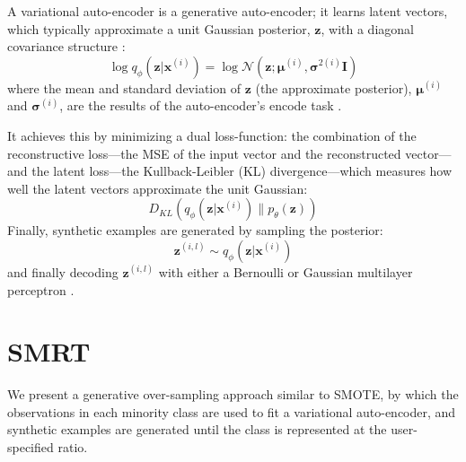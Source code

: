 \documentclass[twoside,11pt]{article}
\begin{document}
A variational auto-encoder is a generative auto-encoder; it learns latent vectors, which typically approximate a unit Gaussian posterior, $\mathbf{z}$, with a diagonal covariance structure \citep{kingma2013auto}:
\begin{equation}
    \log q_{\phi}(\mathbf{z}|\mathbf{x}^{(i)}) = \log \mathcal{N}(\mathbf{z}; \bm{\mu}^{(i)}, \bm{\sigma}^{2(i)}\mathbf{I})
\end{equation}
where the mean and standard deviation of $\mathbf{z}$ (the approximate posterior), $\bm{\mu}^{(i)}$ and $\bm{\sigma}^{(i)}$, are the results of the auto-encoder's encode task \citep{kingma2013auto}.

It achieves this by minimizing a dual loss-function: the combination of the reconstructive loss---the MSE of the input vector and the reconstructed vector---and the latent loss---the Kullback-Leibler (KL) divergence---which measures how well the latent vectors approximate the unit Gaussian:
\begin{equation}
    D_{KL}(q_{\phi}(\mathbf{z}|\mathbf{x}^{(i)})\parallel p_{\theta}(\mathbf{z}))
\end{equation}
Finally, synthetic examples are generated by sampling the posterior:
\begin{equation}
    \mathbf{z}^{(i,l)} \sim q_{\phi}(\mathbf{z}|\mathbf{x}^{(i)})
\end{equation}
and finally decoding $\mathbf{z}^{(i,l)}$ with either a Bernoulli or Gaussian multilayer perceptron \citep{kingma2013auto}.

\section{SMRT}

We present a generative over-sampling approach similar to SMOTE, by which the observations in each minority class are used to fit a variational auto-encoder, and synthetic examples are generated until the class is represented at the user-specified ratio. \\

\makeatletter
\def\BState{\State\hskip-\ALG@thistlm}
\makeatother
\end{document}
